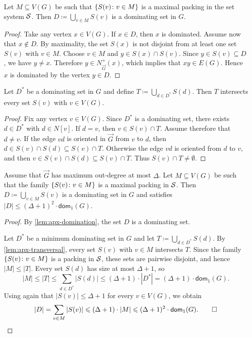 \begin{lemma}\label{lem:apx-domination}
Let $M\subseteq V(G)$ be such that $\setof{S(v)}{v\in M}$ is a maximal packing in the set system ${\cal S}$.
Then $D\coloneqq\bigcup_{v\in M} S(v)$ is a dominating set in $G$.
\end{lemma}
\begin{proof}
Take any vertex $x\in V(G)$.
If $x\in D$, then $x$ is dominated.
Assume now that $x\notin D$.
By maximality, the set $S(x)$ is not disjoint from at least one set $S(v)$ with $v\in M$.
Choose $v\in M$ and $y\in S(x)\cap S(v)$.
Since $y\in S(v)\subseteq D$, we have $y\neq x$.
Therefore $y\in N^+_{\vec{G}}(x)$, which implies that $xy\in E(G)$.
Hence $x$ is dominated by the vertex $y\in D$.
\end{proof}

\begin{lemma}\label{lem:apx-transversal}
Let $D^*$ be a dominating set in $G$ and define $T\coloneqq\bigcup_{d\in D^*} S(d)$.
Then $T$ intersects every set $S(v)$ with $v\in V(G)$.
\end{lemma}
\begin{proof}
Fix any vertex $v\in V(G)$.
Since $D^*$ is a dominating set, there exists $d\in D^*$ with $d\in N[v]$.
If $d=v$, then $v\in S(v)\cap T$.
Assume therefore that $d\neq v$.
If the edge $vd$ is oriented in $\vec{G}$ from $v$ to $d$, then $d\in S(v)\cap S(d)\subseteq S(v)\cap T$.
Otherwise the edge $vd$ is oriented from $d$ to $v$, and then $v\in S(v)\cap S(d)\subseteq S(v)\cap T$.
Thus $S(v)\cap T\neq \emptyset$.
\end{proof}

\begin{lemma}\label{lem:apx-static}
Assume that $\vec{G}$ has maximum out-degree at most $\Delta$.
Let $M\subseteq V(G)$ be such that the family $\setof{S(v)}{v\in M}$ is a maximal packing in ${\cal S}$.
Then $D\coloneqq\bigcup_{v\in M} S(v)$ is a dominating set in $G$ and satisfies $|D|\le (\Delta+1)^2\cdot \mathsf{dom}_1(G)$.
\end{lemma}
\begin{proof}
By \cref{lem:apx-domination}, the set $D$ is a dominating set.

Let $D^*$ be a minimum dominating set in $G$ and let $T\coloneqq\bigcup_{d\in D^*} S(d)$.
By \cref{lem:apx-transversal}, every set $S(v)$ with $v\in M$ intersects $T$.
Since the family $\setof{S(v)}{v\in M}$ is a packing in $\cal S$, these sets are pairwise disjoint, and hence $|M|\le |T|$.
Every set $S(d)$ has size at most $\Delta+1$, so \[|M|\le |T|\le \sum_{d\in D^*} |S(d)|\le (\Delta+1)\cdot |D^*| = (\Delta+1)\cdot \mathsf{dom}_1(G).\]
Using again that $|S(v)|\le \Delta+1$ for every $v\in V(G)$, we obtain \[|D| = \sum_{v\in M} |S(v)|\le (\Delta+1)\cdot |M| \le (\Delta+1)^2\cdot \mathsf{dom}_1(G).\qedhere\]
\end{proof}

